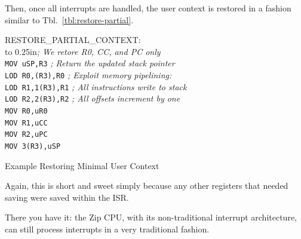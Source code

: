 \documentclass{gqtekspec}
\begin{document}
Then, once all interrupts are handled, the user context is restored in  a 
fashion similar to Tbl.~\ref{tbl:restore-partial}.
\begin{table}\begin{center}
\begin{tabbing}
RESTORE\_PARTIAL\_CONTEXT: \\
\hbox to 0.25in{}\= {\em ; We retore R0, CC, and PC only} \\
\>        {\tt MOV uSP,R3} {\em ; Return the updated stack pointer } \\
\>        {\tt LOD R0,(R3),R0} {\em ; Exploit memory pipelining: }\\
\>        {\tt LOD R1,1(R3),R1} {\em ; All instructions write to stack }\\
\>        {\tt LOD R2,2(R3),R2} {\em ; All offsets increment by one }\\
\>        {\tt MOV R0,uR0} \\
\>        {\tt MOV R1,uCC} \\
\>        {\tt MOV R2,uPC} \\
\>        {\tt MOV 3(R3),uSP} \\
\end{tabbing}
\caption{Example Restoring Minimal User Context}\label{tbl:restore-partial}
\end{center}\end{table}
Again, this is short and sweet simply because any other registers that needed
saving were saved within the ISR.

There you have it: the Zip CPU, with its non-traditional interrupt architecture,
can still process interrupts in a very traditional fashion.
\end{document}
